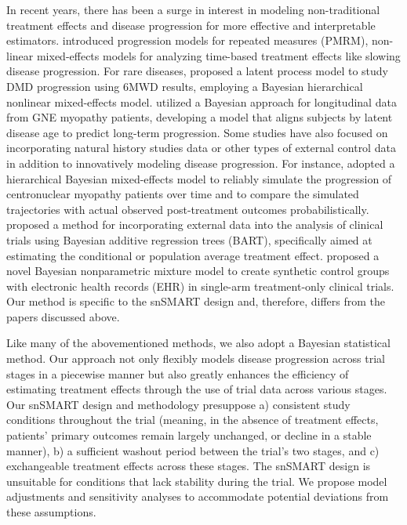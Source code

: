 In recent years, there has been a surge in interest in modeling non-traditional treatment effects and disease progression for more effective and interpretable estimators. \cite{raket2022progression} introduced progression models for repeated measures (PMRM), non-linear mixed-effects models for analyzing time-based treatment effects like slowing disease progression. For rare diseases, \cite{lennie2020latent} proposed a latent process model to study \ac{DMD} progression using \ac{6MWD} results, employing a Bayesian hierarchical nonlinear mixed-effects model. \cite{quintana2019bayesian} utilized a Bayesian approach for longitudinal data from GNE myopathy patients, developing a model that aligns subjects by latent disease age to predict long-term progression. Some studies have also focused on incorporating natural history studies data or other types of external control data in addition to innovatively modeling disease progression. For instance, \cite{fouarge2021hierarchical} adopted a hierarchical Bayesian mixed-effects model to reliably simulate the progression of centronuclear myopathy patients over time and to compare the simulated trajectories with actual observed post-treatment outcomes probabilistically. \cite{zhou2021incorporating} proposed a method for incorporating external data into the analysis of clinical trials using Bayesian additive regression trees (BART), specifically aimed at estimating the conditional or population average treatment effect.  \cite{kiran2021bayesian} proposed a novel Bayesian nonparametric mixture model to create synthetic control groups with electronic health records (EHR) in single-arm treatment-only clinical trials. Our method is specific to the
snSMART design and, therefore, differs from the papers discussed above.

Like many of the abovementioned methods, we also adopt a Bayesian statistical method. Our approach not only flexibly models disease progression across trial stages in a piecewise manner but also greatly enhances the efficiency of estimating treatment effects through the use of trial data across various stages. Our \ac{snSMART} design and methodology presuppose a) consistent study conditions throughout the trial (meaning, in the absence of treatment effects, patients' primary outcomes remain largely unchanged, or decline in a stable manner), b) a sufficient washout period between the trial's two stages, and c) exchangeable treatment effects across these stages. The \ac{snSMART} design is unsuitable for conditions that lack stability during the trial. We propose model adjustments and sensitivity analyses to accommodate potential deviations from these assumptions.


